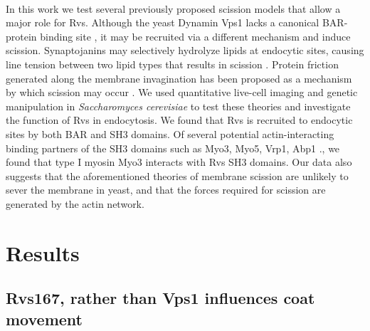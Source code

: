 \documentclass[9pt,lineno]{elife}
\begin{document}
~\\
In this work we test several previously proposed scission models that allow a major role for Rvs. Although the yeast Dynamin Vps1 lacks a canonical BAR-protein binding site \citep{Bui2012,Moustaq2016}, it may be recruited via a different mechanism and induce scission. Synaptojanins may selectively hydrolyze lipids at endocytic sites, causing line tension between two lipid types that results in scission \citep{Liu2009}. Protein friction generated along the membrane invagination has been proposed as a mechanism by which scission may occur \citep{Simunovic2017b}. We used quantitative live-cell imaging and genetic manipulation in \textit{Saccharomyces cerevisiae} to test these theories and investigate the function of Rvs in endocytosis. We found that Rvs is recruited to endocytic sites by both BAR and SH3 domains. Of several potential actin-interacting binding partners of the SH3 domains such as Myo3, Myo5, Vrp1, Abp1 \citep{Lila1997,Colwill1999,Madania1999,Liu2009}., we found that type I myosin Myo3 interacts with Rvs SH3 domains. Our data also suggests that the aforementioned theories of membrane scission are unlikely to sever the membrane in yeast, and that the forces required for scission are generated by the actin network. 



\section{Results}

\subsection{Rvs167, rather than Vps1 influences coat movement}
\end{document}
